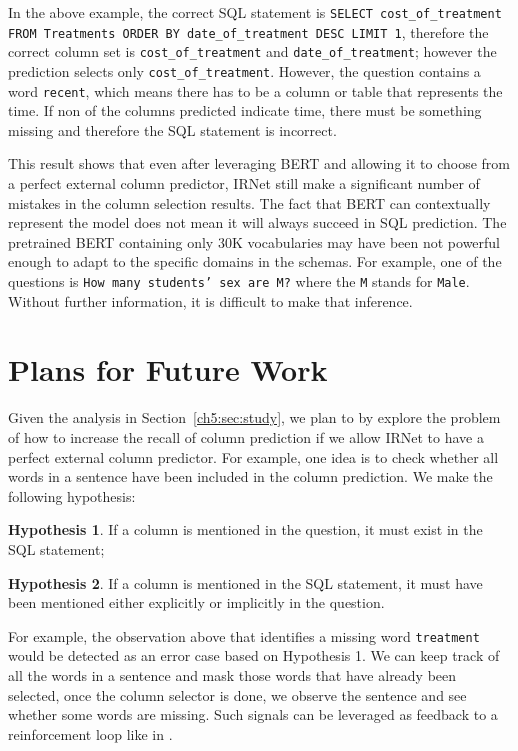 In the above example, the correct SQL statement is \texttt{SELECT cost\_of\_treatment FROM Treatments ORDER BY date\_of\_treatment DESC LIMIT 1}, therefore the correct column set is \texttt{cost\_of\_treatment} and \texttt{date\_of\_treatment}; however the prediction selects only \texttt{cost\_of\_treatment}. However, the question contains a word \texttt{recent}, which means there has to be a column or table that represents the time. If non of the columns predicted indicate time, there must be something missing and therefore the SQL statement is incorrect. 

This result shows that even after leveraging BERT and allowing it to choose from a perfect external column predictor, IRNet still make a significant number of mistakes in the column selection results. The fact that BERT can contextually represent the model does not mean it will always succeed in SQL prediction. The pretrained BERT containing only 30K vocabularies may have been not powerful enough to adapt to the specific domains in the schemas. For example, one of the questions is \texttt{How many students' sex are M?} where the \texttt{M} stands for \texttt{Male}. Without further information, it is difficult to make that inference. 

\section{Plans for Future Work}
\label{sec:rq3}

Given the analysis in Section~\ref{ch5:sec:study}, we plan to by explore the problem of how to increase the recall of column prediction if we allow IRNet to have a perfect external column predictor. For example, one idea is to check whether all words in a sentence have been included in the column prediction. We make the following hypothesis:

\textbf{Hypothesis 1}. If a column is mentioned in the question, it must exist in the SQL statement;

\textbf{Hypothesis 2}. If a column is mentioned in the SQL statement, it must have been mentioned either explicitly or implicitly in the question. 

For example, the observation above that identifies a missing word \texttt{treatment} would be detected as an error case based on Hypothesis 1. We can keep track of all the words in a sentence and mask those words that have already been selected, once the column selector is done, we observe the sentence and see whether some words are missing. Such signals can be leveraged as feedback to a reinforcement loop like in \cite{zhong2017seq2sql}. 